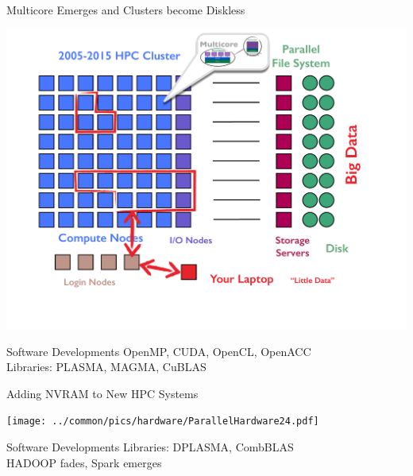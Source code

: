 \begin{frame}{Multicore Emerges and Clusters become Diskless}
\begin{minipage}{8.0cm}
  \includegraphics[trim=2cm 0cm 0cm 0cm,clip=true,height=0.8\textheight]
  {../common/pics/hardware/ParallelHardware23.pdf}
\end{minipage}
\begin{minipage}{3.7cm}\small
  \begin{block}{Software Developments}\pause
    \scriptsize OpenMP, CUDA, OpenCL, OpenACC \\[1ex]
    Libraries: PLASMA, MAGMA, CuBLAS
  \end{block}
\end{minipage}
\end{frame}

\begin{frame}{Adding NVRAM to New HPC Systems}
\begin{minipage}{8.0cm}
\texttt{[image: ../common/pics/hardware/ParallelHardware24.pdf]}
\end{minipage}
\begin{minipage}{3.7cm}\small
  \begin{block}{Software Developments}\pause
    \scriptsize
    Libraries: DPLASMA, CombBLAS \\[1ex]
    HADOOP fades, Spark emerges
  \end{block}
\end{minipage}
\end{frame}

